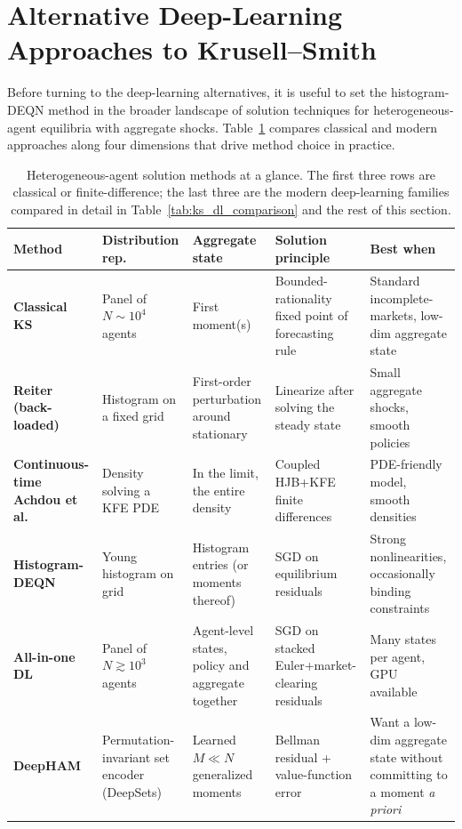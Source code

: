 \documentclass[11pt,a4paper]{report}
\begin{document}
\section{Alternative Deep-Learning Approaches to Krusell--Smith}
\label{sec:ks_alternatives}

Before turning to the deep-learning alternatives, it is useful to set the histogram-DEQN method in the broader landscape of solution techniques for heterogeneous-agent equilibria with aggregate shocks.  Table~\ref{tab:ha_methods_landscape} compares classical and modern approaches along four dimensions that drive method choice in practice.

\begin{table}[ht]
\centering
\footnotesize
\setlength{\tabcolsep}{4pt}
\begin{tabular}{@{} >{\bfseries}p{2.8cm} p{2.6cm} p{2.6cm} p{2.6cm} p{2.6cm} @{}}
\toprule
\textbf{Method} & \textbf{Distribution rep.} & \textbf{Aggregate state} & \textbf{Solution principle} & \textbf{Best when} \\
\midrule
Classical KS \citep{krusell1998income}
 & Panel of $N \sim 10^4$ agents
 & First moment(s)
 & Bounded-rationality fixed point of forecasting rule
 & Standard incomplete-markets, low-dim aggregate state \\
\addlinespace
Reiter (back-loaded) \citep{reiter2009}
 & Histogram on a fixed grid
 & First-order perturbation around stationary
 & Linearize after solving the steady state
 & Small aggregate shocks, smooth policies \\
\addlinespace
Continuous-time Achdou et al.\ \citep{achdou2022income}
 & Density solving a KFE PDE
 & In the limit, the entire density
 & Coupled HJB+KFE finite differences
 & PDE-friendly model, smooth densities \\
\addlinespace
Histogram-DEQN \citep{azinovicDEEPEQUILIBRIUMNETS2022}
 & Young histogram on grid
 & Histogram entries (or moments thereof)
 & SGD on equilibrium residuals
 & Strong nonlinearities, occasionally binding constraints \\
\addlinespace
All-in-one DL \citep{maliar2021deep}
 & Panel of $N \gtrsim 10^3$ agents
 & Agent-level states, policy and aggregate together
 & SGD on stacked Euler+market-clearing residuals
 & Many states per agent, GPU available \\
\addlinespace
DeepHAM \citep{han2023deepham}
 & Permutation-invariant set encoder (DeepSets)
 & Learned $M\!\ll\!N$ generalized moments
 & Bellman residual + value-function error
 & Want a low-dim aggregate state without committing to a moment \emph{a priori} \\
\bottomrule
\end{tabular}
\caption{Heterogeneous-agent solution methods at a glance.  The first three rows are classical or finite-difference; the last three are the modern deep-learning families compared in detail in Table~\ref{tab:ks_dl_comparison} and the rest of this section.}
\label{tab:ha_methods_landscape}
\end{table}
\end{document}
